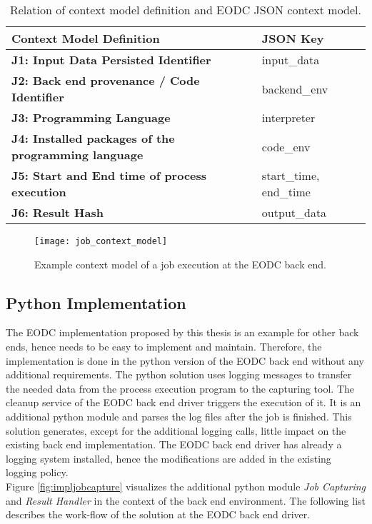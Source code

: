 \documentclass[draft,final]{vutinfth} %
\begin{document}
\begin{table}[]
	\caption{Relation of context model definition and EODC JSON context model.}
	\begin{tabular}{l|l}
		\textbf{Context Model Definition} & \textbf{JSON Key} \\ \hline
		\textbf{J1: Input Data Persisted Identifier} & input\_data \\ \hline
		\textbf{J2: Back end provenance / Code Identifier} & backend\_env \\ \hline
		\textbf{J3: Programming Language} & interpreter \\ \hline
		\textbf{J4: Installed packages of the programming language} & code\_env \\ \hline
		\textbf{J5: Start and End time of process execution} & start\_time, end\_time \\ \hline
		\textbf{J6: Result Hash} & output\_data \\ %
	\end{tabular}
\label{Tab:contextmodel}
\end{table}

\begin{figure}[h]
	\centering
	\texttt{[image: job\_context\_model]}
	\caption{Example context model of a job execution at the EODC back end.}
	\label{fig:job_context_model} %
\end{figure}

\subsection{Python Implementation}\label{Implementation:Python Implementation}
The EODC implementation proposed by this thesis is an example for other back ends, hence needs to be easy to implement and maintain. Therefore, the implementation is done in the python version of the EODC back end without any additional requirements. The python solution uses logging messages to transfer the needed data from the process execution program to the capturing tool. The cleanup service of the EODC back end driver triggers the execution of it. It is an additional python module and parses the log files after the job is finished. This solution generates, except for the additional logging calls, little impact on the existing back end implementation. The EODC back end driver has already a logging system installed, hence the modifications are added in the existing logging policy. \\
Figure \ref{fig:impljobcapture} visualizes the additional python module \textit{Job Capturing} and \textit{Result Handler} in the context of the back end environment. The following list describes the work-flow of the solution at the EODC back end driver. 
\end{document}
